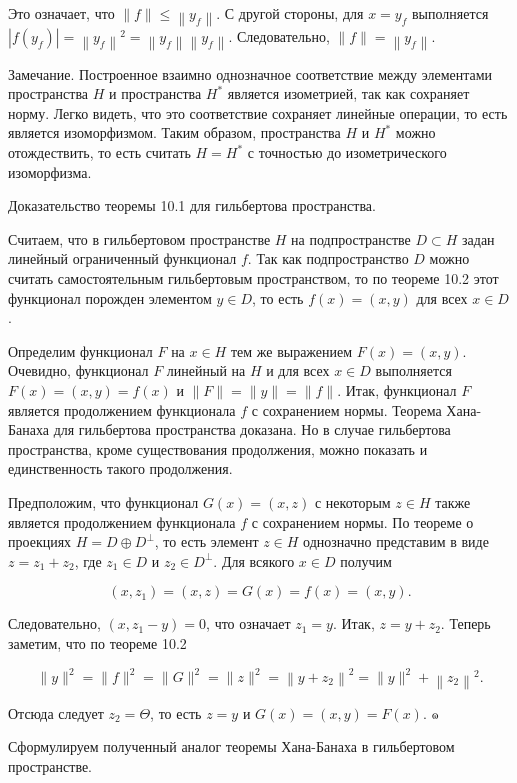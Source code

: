 Это означает, что $\|f\| \leq\left\|y_{f}\right\|$. С другой стороны, для $x=y_{f}$ выполняется $\left|f\left(y_{f}\right)\right|=\left\|y_{f}\right\|^{2}=\left\|y_{f}\right\|\left\|y_{f}\right\|$. Следовательно, $\|f\|=\left\|y_{f}\right\|$.

Замечание. Построенное взаимно однозначное соответствие между элементами пространства $H$ и пространства $H^{*}$ является изометрией, так как сохраняет норму. Легко видеть, что это соответствие сохраняет линейные операции, то есть является изоморфизмом. Таким образом, пространства $H$ и $H^{*}$ можно отождествить, то есть считать $H=H^{*}$ с точностью до изометрического изоморфизма.

Доказательство теоремы 10.1 для гильбертова пространства.

Считаем, что в гильбертовом пространстве $H$ на подпространстве $D \subset H$ задан линейный ограниченный функционал $f$. Так как подпространство $D$ можно считать самостоятельным гильбертовым пространством, то по теореме 10.2 этот функционал порожден элементом $y \in D$, то есть $f(x)=(x, y)$ для всех $x \in D$.

Определим функционал $F$ на $x \in H$ тем же выражением $F(x)=(x, y)$. Очевидно, функционал $F$ линейный на $H$ и для всех $x \in D$ выполняется $F(x)=(x, y)=f(x)$ и $\|F\|=\|y\|=\|f\|$. Итак, функционал $F$ является продолжением функционала $f$ с сохранением нормы. Теорема Хана-Банаха для гильбертова пространства доказана. Но в случае гильбертова пространства, кроме существования продолжения, можно показать и единственность такого продолжения.

Предположим, что функционал $G(x)=(x, z)$ с некоторым $z \in H$ также является продолжением функционала $f$ с сохранением нормы. По теореме о проекциях $H=D \oplus D^{\perp}$, то есть элемент $z \in H$ однозначно представим в виде $z=z_{1}+z_{2}$, где $z_{1} \in D$ и $z_{2} \in D^{\perp}$. Для всякого $x \in D$ получим

\[
\left(x, z_{1}\right)=(x, z)=G(x)=f(x)=(x, y) .
\]

Следовательно, $\left(x, z_{1}-y\right)=0$, что означает $z_{1}=y$. Итак, $z=y+z_{2}$. Теперь заметим, что по теореме 10.2

\[
\|y\|^{2}=\|f\|^{2}=\|G\|^{2}=\|z\|^{2}=\left\|y+z_{2}\right\|^{2}=\|y\|^{2}+\left\|z_{2}\right\|^{2} .
\]

Отсюда следует $z_{2}=\Theta$, то есть $z=y$ и $G(x)=(x, y)=F(x)$. ๑

Сформулируем полученный аналог теоремы Хана-Банаха в гильбертовом пространстве.

